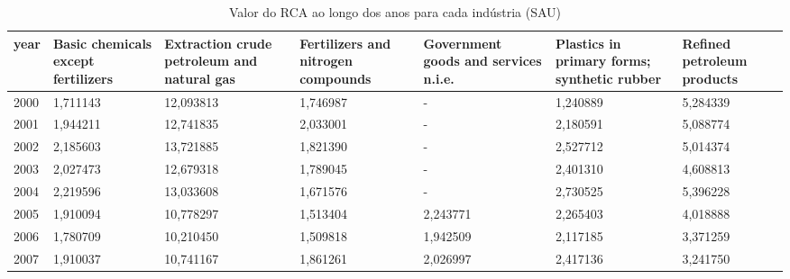 \begin{table}
\centering
\caption{Valor do RCA ao longo dos anos para cada indústria (SAU)}
\begin{tabular}{p{1cm}p{2cm}p{2cm}p{2cm}p{2cm}p{2cm}p{2cm}}
\toprule
 year &  Basic chemicals except fertilizers &  Extraction crude petroleum and natural gas &  Fertilizers and nitrogen compounds &  Government goods and services n.i.e. &  Plastics in primary forms; synthetic rubber &  Refined petroleum products \\
\midrule
 2000 &                            1,711143 &                                   12,093813 &                            1,746987 &                                     - &                                     1,240889 &                    5,284339 \\
 2001 &                            1,944211 &                                   12,741835 &                            2,033001 &                                     - &                                     2,180591 &                    5,088774 \\
 2002 &                            2,185603 &                                   13,721885 &                            1,821390 &                                     - &                                     2,527712 &                    5,014374 \\
 2003 &                            2,027473 &                                   12,679318 &                            1,789045 &                                     - &                                     2,401310 &                    4,608813 \\
 2004 &                            2,219596 &                                   13,033608 &                            1,671576 &                                     - &                                     2,730525 &                    5,396228 \\
 2005 &                            1,910094 &                                   10,778297 &                            1,513404 &                              2,243771 &                                     2,265403 &                    4,018888 \\
 2006 &                            1,780709 &                                   10,210450 &                            1,509818 &                              1,942509 &                                     2,117185 &                    3,371259 \\
 2007 &                            1,910037 &                                   10,741167 &                            1,861261 &                              2,026997 &                                     2,417136 &                    3,241750 \\

\end{tabular}
\end{table}
